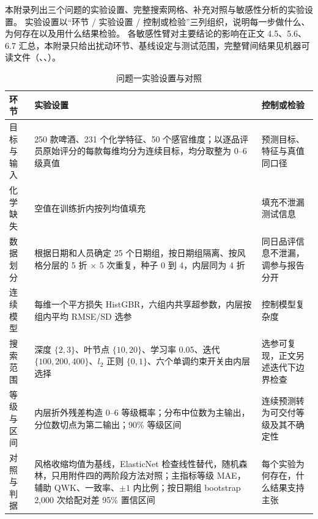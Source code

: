 本附录列出三个问题的实验设置、完整搜索网格、补充对照与敏感性分析的实验设置。
实验设置以“环节 / 实验设置 / 控制或检验”三列组织，说明每一步做什么、为何存在以及用什么结果检验。
各敏感性臂对主要结论的影响在正文 4.5、5.6、6.7 汇总，本附录只给出扰动环节、基线设定与测试范围，完整臂间结果见机器可读文件（、、）。

\begin{table}[H]
\centering\small
\caption{问题一实验设置与对照}
\label{tab:q1-setup}
\begin{tabular}{p{3.0cm}p{5.4cm}p{4.2cm}}
\toprule
环节 & 实验设置 & 控制或检验 \\
\midrule
目标与输入 & 250 款啤酒、231 个化学特征、50 个感官维度；以逐品评员原始评分的每款每维均分为连续目标，均分取整为 0--6 级真值 & 预测目标、特征与真值同口径 \\
\addlinespace
化学缺失 & 空值在训练折内按列均值填充 & 填充不泄漏测试信息 \\
\addlinespace
数据划分 & 根据日期和人员确定 25 个日期组，按日期组隔离、按风格分层的 5 折 $\times$ 5 次重复，种子 0 到 4，内层同为 4 折 & 同日品评信息不泄漏，调参与报告分开 \\
\addlinespace
连续模型 & 每维一个平方损失 HistGBR，六组内共享超参数，内层按组内平均 RMSE/SD 选参 & 控制模型复杂度 \\
\addlinespace
搜索范围 & 深度 $\{2,3\}$、叶节点 $\{10,20\}$、学习率 0.05、迭代 $\{100,200,400\}$、$l_2$ 正则 $\{0,1\}$、六个单调约束开关由内层选择 & 选参可复现，正文另述迭代下边界检查 \\
\addlinespace
等级与区间 & 内层折外残差构造 0--6 等级概率；分布中位数为主输出，分位数切点为第二输出；90\% 等级区间 & 连续预测转为可交付等级及其不确定性 \\
\addlinespace
对照与判据 & 风格收缩均值为基线，ElasticNet 检查线性替代，随机森林，只用附件四的两阶段方法对照；主指标等级 MAE，辅助 QWK、一致率、$\pm1$ 内比例；按日期组 bootstrap 2,000 次给配对差 95\% 置信区间 & 每个实验为何存在，什么结果支持主张 \\
\bottomrule
\end{tabular}
\end{table}

